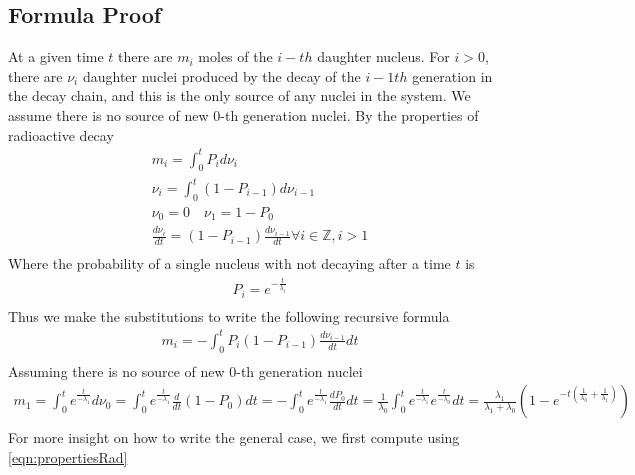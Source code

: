 \documentclass[12pt]{article}
\begin{document}
\subsection{Formula Proof}
At a given time $t$ there are $m_i$ moles of the $i-th$ daughter nucleus. For $i>0$, there are $\nu_{i}$ daughter nuclei produced by the decay of the $i-1th$ generation in the decay chain, and this is the only source of any nuclei in the system. We assume there is no source of new 0-th generation nuclei. By the properties of radioactive decay
\begin{equation}\label{eqn:propertiesRad}
\begin{split}
m_i = \int_0^t P_id\nu_{i}\\
\nu_i = \int_0^t (1-P_{i-1})d\nu_{i-1}\\
\nu_0 = 0\quad \nu_1 = 1-P_0\\
\frac{d\nu_{i}}{dt} = (1-P_{i-1})\frac{d\nu_{i-1}}{dt}\forall i\in\mathbb{Z}, i>1\\
\end{split}
\end{equation}
Where the probability of a single nucleus with not decaying after a time $t$ is
\begin{equation}
\begin{split}
P_i = e^{-\frac{t}{\lambda_{i}}}\\
\end{split}
\end{equation}
Thus we make the substitutions to write the following recursive formula
\begin{equation}\label{eqn:recursiveForm}
\begin{split}
m_i = -\int_0^t P_i(1-P_{i-1})\frac{d\nu_{i-1}}{dt}dt\\
\end{split}
\end{equation}
Assuming there is no source of new 0-th generation nuclei
\begin{equation}
\begin{split}
m_1 = \int_0^te^{\frac{t}{-\lambda_1}}d\nu_0 = \int_0^te^{\frac{t}{-\lambda_1}}\frac{d}{dt}(1-P_0)dt = -\int_0^te^{\frac{t}{-\lambda_1}}\frac{dP_0}{dt}dt = \frac{1}{\lambda_0}\int_0^te^{\frac{t}{-\lambda_1}}e^{\frac{t}{-\lambda_0}}dt = \frac{\lambda_1}{\lambda_1+\lambda_0}(1-e^{-t(\frac{1}{\lambda_0}+\frac{1}{\lambda_1})}) \\
\end{split}
\end{equation}
For more insight on how to write the general case, we first compute using \ref{eqn:propertiesRad}
\end{document}

